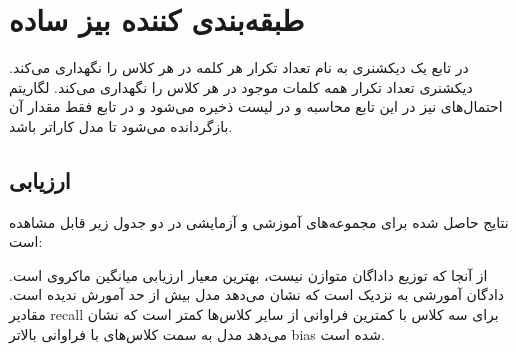 \documentclass{article}
\begin{document}
	\section{طبقه‌بندی کننده بیز ساده}
	در تابع 
	یک دیکشنری به نام 
	تعداد تکرار هر کلمه در هر کلاس را نگهداری می‌کند. دیکشنری 
	تعداد تکرار همه کلمات موجود در هر کلاس را نگهداری می‌کند. لگاریتم احتمال‌های 
	نیز در این تابع محاسبه و در لیست 
	ذخیره می‌شود و در تابع 
	فقط مقدار آن بازگردانده می‌شود تا مدل کاراتر
	 باشد.
	 \subsection{ارزیابی}
	 نتایج حاصل شده برای مجموعه‌های آموزشی و آزمایشی در دو جدول زیر قابل مشاهده است:
	 
	 \begin{figure}[h]
	 	\begin{center}
	 		\hspace*{0.2cm}
	 	\end{center}
	 \end{figure}
 	از آنجا که توزیع داداگان متوازن نیست، بهترین معیار ارزیابی میانگین ماکروی
 	  است.  دادگان آمورشی به  نزدیک است که نشان می‌دهد مدل بیش از حد آمورش ندیده است. مقادیر recall برای سه کلاس با کمترین فراوانی از سایر کلاس‌ها کمتر است که نشان می‌دهد مدل به سمت کلاس‌های با فراوانی بالاتر bias شده است.
 	  
\end{document}
